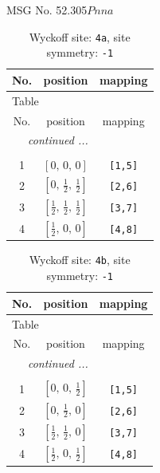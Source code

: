 \documentclass[fleqn,8pt]{jsarticle}
\begin{document}
\setcounter{MaxMatrixCols}{32}

\renewcommand{\tablename}{Table~}
\renewcommand{\figurename}{Figure~}
\begin{center}
\LARGE
MSG No. 52.305\quad$Pnna$
\end{center}
\renewcommand{\arraystretch}{1.2}
\begin{longtable}{ccc}
\caption{Wyckoff site: {\tt 4a}, site symmetry: {\tt -1}}
 \\
 \hline \hline
No. & position & mapping \\ \hline \endfirsthead

\multicolumn{2}{l}{\tablename\ \thetable{}} \\
 \hline \hline
No. & position & mapping \\ \hline \endhead

 \hline \hline
\multicolumn{2}{r}{\footnotesize\it continued ...} \\ \endfoot

 \hline \hline
\multicolumn{2}{r}{} \\ \endlastfoot

1 & $\left[ 0,\, 0,\, 0 \right]$ & {\tt [1,5]} \\ \hline
2 & $\left[ 0,\, \frac{1}{2},\, \frac{1}{2} \right]$ & {\tt [2,6]} \\ \hline
3 & $\left[ \frac{1}{2},\, \frac{1}{2},\, \frac{1}{2} \right]$ & {\tt [3,7]} \\ \hline
4 & $\left[ \frac{1}{2},\, 0,\, 0 \right]$ & {\tt [4,8]} \\
\end{longtable}
\renewcommand{\arraystretch}{1.2}
\begin{longtable}{ccc}
\caption{Wyckoff site: {\tt 4b}, site symmetry: {\tt -1}}
 \\
 \hline \hline
No. & position & mapping \\ \hline \endfirsthead

\multicolumn{2}{l}{\tablename\ \thetable{}} \\
 \hline \hline
No. & position & mapping \\ \hline \endhead

 \hline \hline
\multicolumn{2}{r}{\footnotesize\it continued ...} \\ \endfoot

 \hline \hline
\multicolumn{2}{r}{} \\ \endlastfoot

1 & $\left[ 0,\, 0,\, \frac{1}{2} \right]$ & {\tt [1,5]} \\ \hline
2 & $\left[ 0,\, \frac{1}{2},\, 0 \right]$ & {\tt [2,6]} \\ \hline
3 & $\left[ \frac{1}{2},\, \frac{1}{2},\, 0 \right]$ & {\tt [3,7]} \\ \hline
4 & $\left[ \frac{1}{2},\, 0,\, \frac{1}{2} \right]$ & {\tt [4,8]} \\
\end{longtable}
\end{document}
